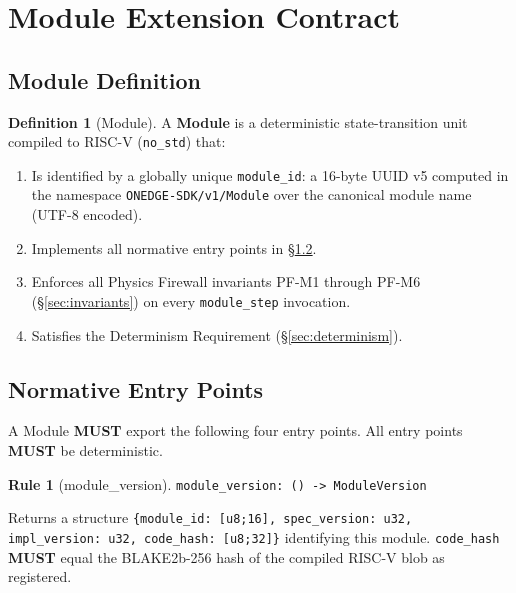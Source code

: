 \documentclass[11pt,letterpaper]{article}
\theoremstyle{definition}
\newtheorem{definition}{Definition}[section]
\newtheorem{specrule}{Rule}[section]
\newcommand{\MUST}{\textbf{MUST}}
\begin{document}
\section{Module Extension Contract}
\label{sec:contract}

\subsection{Module Definition}

\begin{definition}[Module]
\label{def:module}
A \textbf{Module} is a deterministic state-transition unit compiled to RISC-V (\texttt{no\_std}) that:
\begin{enumerate}[label=(\roman*)]
    \item Is identified by a globally unique \texttt{module\_id}: a 16-byte UUID v5 computed in the namespace \texttt{ONEDGE-SDK/v1/Module} over the canonical module name (UTF-8 encoded).
    \item Implements all normative entry points in §\ref{sec:entrypoints}.
    \item Enforces all Physics Firewall invariants PF-M1 through PF-M6 (§\ref{sec:invariants}) on every \texttt{module\_step} invocation.
    \item Satisfies the Determinism Requirement (§\ref{sec:determinism}).
\end{enumerate}
\end{definition}

\subsection{Normative Entry Points}
\label{sec:entrypoints}

A Module \MUST{} export the following four entry points. All entry points \MUST{} be deterministic.

\begin{specrule}[module\_version]
\label{rule:version}
\texttt{module\_version: () -> ModuleVersion}

Returns a structure \texttt{\{module\_id: [u8;16], spec\_version: u32, impl\_version: u32, code\_hash: [u8;32]\}} identifying this module. \texttt{code\_hash} \MUST{} equal the BLAKE2b-256 hash of the compiled RISC-V blob as registered.
\end{specrule}
\end{document}

